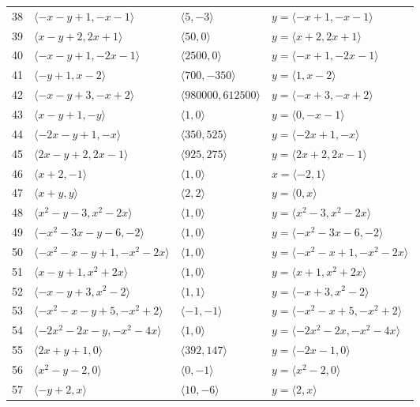 \documentclass[11pt]{article}
\begin{document}
\begin{longtable}{@{}rlll@{}}
38 & $\langle -x-y+1,-x-1\rangle$ & $\langle 5,-3\rangle$ & $y=\langle -x+1,-x-1\rangle$\\
39 & $\langle x-y+2,2x+1\rangle$ & $\langle 50,0\rangle$ & $y=\langle x+2,2x+1\rangle$\\
40 & $\langle -x-y+1,-2x-1\rangle$ & $\langle 2500,0\rangle$ & $y=\langle -x+1,-2x-1\rangle$\\
41 & $\langle -y+1,x-2\rangle$ & $\langle 700,-350\rangle$ & $y=\langle 1,x-2\rangle$\\
42 & $\langle -x-y+3,-x+2\rangle$ & $\langle 980000,612500\rangle$ & $y=\langle -x+3,-x+2\rangle$\\
43 & $\langle x-y+1,-y\rangle$ & $\langle 1,0\rangle$ & $y=\langle 0,-x-1\rangle$\\
44 & $\langle -2x-y+1,-x\rangle$ & $\langle 350,525\rangle$ & $y=\langle -2x+1,-x\rangle$\\
45 & $\langle 2x-y+2,2x-1\rangle$ & $\langle 925,275\rangle$ & $y=\langle 2x+2,2x-1\rangle$\\
46 & $\langle x+2,-1\rangle$ & $\langle 1,0\rangle$ & $x=\langle -2,1\rangle$\\
47 & $\langle x+y,y\rangle$ & $\langle 2,2\rangle$ & $y=\langle 0,x\rangle$\\
48 & $\langle x^{2}-y-3,x^{2}-2x\rangle$ & $\langle 1,0\rangle$ & $y=\langle x^{2}-3,x^{2}-2x\rangle$\\
49 & $\langle -x^{2}-3x-y-6,-2\rangle$ & $\langle 1,0\rangle$ & $y=\langle -x^{2}-3x-6,-2\rangle$\\
50 & $\langle -x^{2}-x-y+1,-x^{2}-2x\rangle$ & $\langle 1,0\rangle$ & $y=\langle -x^{2}-x+1,-x^{2}-2x\rangle$\\
51 & $\langle x-y+1,x^{2}+2x\rangle$ & $\langle 1,0\rangle$ & $y=\langle x+1,x^{2}+2x\rangle$\\
52 & $\langle -x-y+3,x^{2}-2\rangle$ & $\langle 1,1\rangle$ & $y=\langle -x+3,x^{2}-2\rangle$\\
53 & $\langle -x^{2}-x-y+5,-x^{2}+2\rangle$ & $\langle -1,-1\rangle$ & $y=\langle -x^{2}-x+5,-x^{2}+2\rangle$\\
54 & $\langle -2x^{2}-2x-y,-x^{2}-4x\rangle$ & $\langle 1,0\rangle$ & $y=\langle -2x^{2}-2x,-x^{2}-4x\rangle$\\
55 & $\langle 2x+y+1,0\rangle$ & $\langle 392,147\rangle$ & $y=\langle -2x-1,0\rangle$\\
56 & $\langle x^{2}-y-2,0\rangle$ & $\langle 0,-1\rangle$ & $y=\langle x^{2}-2,0\rangle$\\
57 & $\langle -y+2,x\rangle$ & $\langle 10,-6\rangle$ & $y=\langle 2,x\rangle$\\

\end{longtable}
\end{document}
